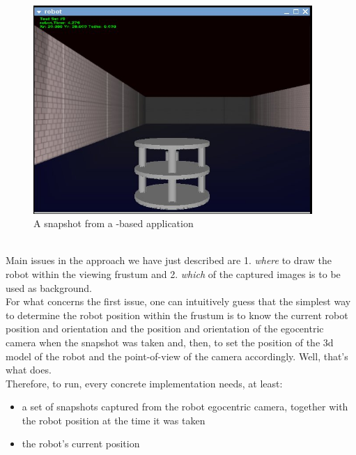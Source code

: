 \begin{figure}[!h]
  \begin{center}
    \includegraphics[width=300pt]{img/rear_snapshot_large.jpg}
    \caption{A snapshot from a \framework{}-based application}
    \label{fig:snap}
  \end{center}
\end{figure}
\\
Main issues in the approach we have just described are 1. 
\textit{where} to draw the robot within the viewing frustum 
and 2. \textit{which} of the captured images is to be used 
as background.
\\
For what concerns the first issue, one can intuitively guess 
that the simplest way to determine the robot position 
within the frustum is to know the current robot position 
and orientation and the position and orientation of the egocentric 
camera when the snapshot was taken and, then, to set the 
position of the 3d model of the robot and the point-of-view 
of the camera accordingly.
Well, that's what \framework{} does.
\\
Therefore, to run, every \framework{} concrete implementation 
needs, at least:

\begin{itemize}
  \item a set of snapshots captured from the robot egocentric camera, 
    together with the robot position at the time it was taken
  \item the robot's current position
\end{itemize}

